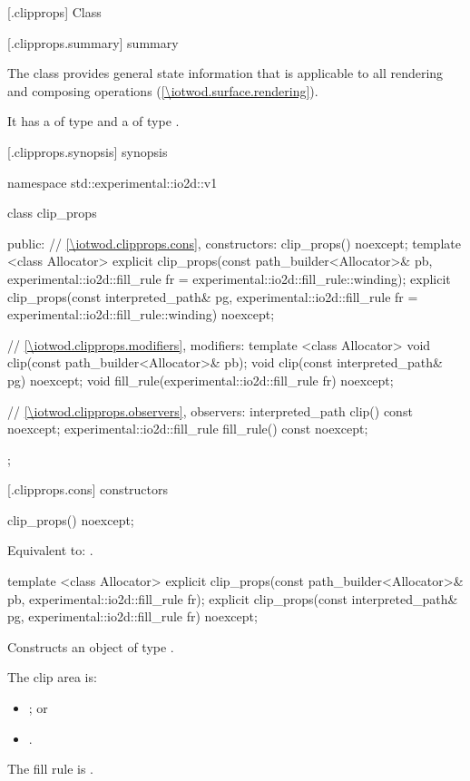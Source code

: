 
 [\iotwod.clipprops] {Class }

 [\iotwod.clipprops.summary] { summary}

\pnum
The  class provides general state information that is applicable to all rendering and composing operations (\ref{\iotwod.surface.rendering}).

\pnum
It has a  of type  and a  of type .

 [\iotwod.clipprops.synopsis] { synopsis}

\begin{codeblock}
namespace std::experimental::io2d::v1 {
  class clip_props {
  public:
    // \ref{\iotwod.clipprops.cons}, constructors:
    clip_props() noexcept;
    template <class Allocator>
    explicit clip_props(const path_builder<Allocator>& pb,
      experimental::io2d::fill_rule fr = 
      experimental::io2d::fill_rule::winding);
    explicit clip_props(const interpreted_path& pg, experimental::io2d::fill_rule fr =
      experimental::io2d::fill_rule::winding) noexcept;

    // \ref{\iotwod.clipprops.modifiers}, modifiers:
    template <class Allocator>
    void clip(const path_builder<Allocator>& pb);
    void clip(const interpreted_path& pg) noexcept;
    void fill_rule(experimental::io2d::fill_rule fr) noexcept;
    
    // \ref{\iotwod.clipprops.observers}, observers:
    interpreted_path clip() const noexcept;
    experimental::io2d::fill_rule fill_rule() const noexcept;
  };
}
\end{codeblock}

 [\iotwod.clipprops.cons] { constructors}

%
\begin{itemdecl}
clip_props() noexcept;
\end{itemdecl}
\begin{itemdescr}
\pnum
\effects
Equivalent to: .
\end{itemdescr}

%
\begin{itemdecl}
template <class Allocator>
explicit clip_props(const path_builder<Allocator>& pb,
  experimental::io2d::fill_rule fr);
explicit clip_props(const interpreted_path& pg, experimental::io2d::fill_rule fr) 
  noexcept;
\end{itemdecl}
\begin{itemdescr}
\pnum
\effects
Constructs an object of type .

\pnum
The clip area is:
\begin{itemize}
\item {}; or
\item {}.
\end{itemize}

\pnum
The fill rule is .
\end{itemdescr}

